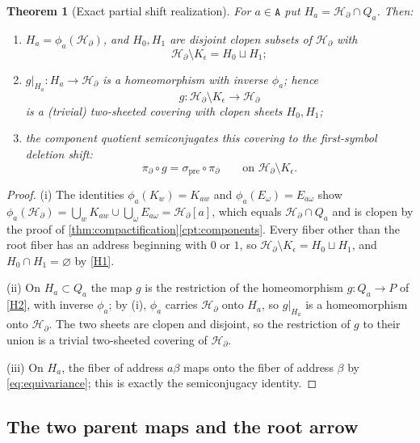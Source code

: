 \documentclass[11pt,reqno]{amsart}
\numberwithin{equation}{section}
\theoremstyle{plain}
\newtheorem{theorem}{Theorem}[section]
\theoremstyle{definition}
\theoremstyle{remark}
\newcommand{\A}{\mathtt A}
\newcommand{\HB}{\mathcal H_\partial}
\newcommand{\spre}{\sigma_{\mathrm{pre}}}
\newcommand{\rootK}{K_{\epsilon}}
\newcommand{\projB}{\pi_\partial}
\begin{document}
\begin{theorem}[Exact partial shift realization]
\label{thm:partial-shift}
For $a\in\A$ put $H_a=\HB\cap Q_a$.  Then:
\begin{enumerate}[label=\textup{(\roman*)}]
 \item $H_a=\phi_a(\HB)$, and $H_0,H_1$ are disjoint clopen subsets of
  $\HB$ with
  \[
   \HB\setminus\rootK=H_0\sqcup H_1 ;
  \]
 \item $g|_{H_a}\colon H_a\to\HB$ is a homeomorphism with inverse
  $\phi_a$; hence
  \[
   g\colon\HB\setminus\rootK\longrightarrow\HB
  \]
  is a (trivial) two-sheeted covering with clopen sheets $H_0,H_1$;
 \item the component quotient semiconjugates this covering to the
  first-symbol deletion shift:
  \[
   \projB\circ g=\spre\circ\projB
   \qquad\text{on }\HB\setminus\rootK .
  \]
\end{enumerate}
\end{theorem}

\begin{proof}
(i)  The identities $\phi_a(K_w)=K_{aw}$ and
$\phi_a(E_\omega)=E_{a\omega}$ show
$\phi_a(\HB)=\bigcup_wK_{aw}\cup\bigcup_\omega E_{a\omega}=\HB[a]$,
which equals $\HB\cap Q_a$ and is clopen by the proof of
\cref{thm:compactification}\ref{cpt:components}.  Every fiber other
than the root fiber has an address beginning with $0$ or $1$, so
$\HB\setminus\rootK=H_0\sqcup H_1$, and $H_0\cap H_1=\varnothing$ by
\ref{H1}.

(ii)  On $H_a\subset Q_a$ the map $g$ is the restriction of the
homeomorphism $g\colon Q_a\to P$ of \ref{H2}, with inverse $\phi_a$;
by (i), $\phi_a$ carries $\HB$ onto $H_a$, so $g|_{H_a}$ is a
homeomorphism onto $\HB$.  The two sheets are clopen and disjoint, so
the restriction of $g$ to their union is a trivial two-sheeted
covering of $\HB$.

(iii)  On $H_a$, the fiber of address $a\beta$ maps onto the fiber of
address $\beta$ by \eqref{eq:equivariance}; this is exactly the
semiconjugacy identity.
\end{proof}

\subsection{The two parent maps and the root arrow}
\end{document}
